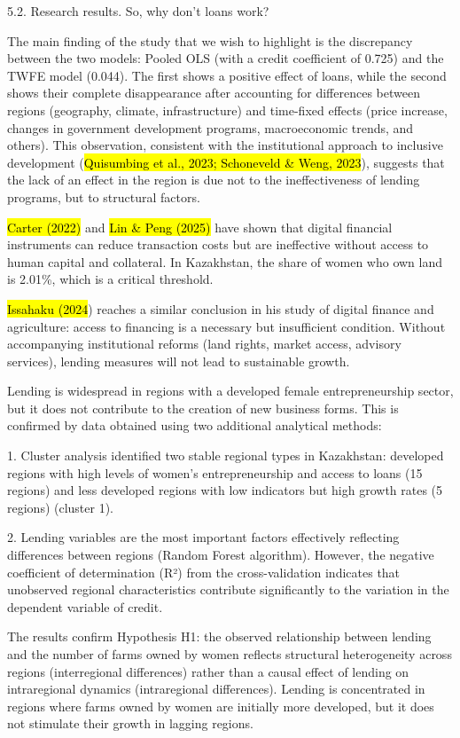 5.2. Research results. So, why don't loans work?

The main finding of the study that we wish to highlight is the
discrepancy between the two models: Pooled OLS (with a credit
coefficient of 0.725) and the TWFE model (0.044). The first shows a
positive effect of loans, while the second shows their complete
disappearance after accounting for differences between regions
(geography, climate, infrastructure) and time-fixed effects (price
increase, changes in government development programs, macroeconomic
trends, and others). This observation, consistent with the institutional
approach to inclusive development (\hl{Quisumbing et al., 2023;
Schoneveld \& Weng, 2023}), suggests that the lack of an effect in the
region is due not to the ineffectiveness of lending programs, but to
structural factors.

\hl{Carter (2022)} and \hl{Lin \& Peng (2025)} have shown that digital
financial instruments can reduce transaction costs but are ineffective
without access to human capital and collateral. In Kazakhstan, the share
of women who own land is 2.01\%, which is a critical threshold.

\hl{Issahaku (2024}) reaches a similar conclusion in his study of
digital finance and agriculture: access to financing is a necessary but
insufficient condition. Without accompanying institutional reforms (land
rights, market access, advisory services), lending measures will not
lead to sustainable growth.

Lending is widespread in regions with a developed female
entrepreneurship sector, but it does not contribute to the creation of
new business forms. This is confirmed by data obtained using two
additional analytical methods:

1. Cluster analysis identified two stable regional types in Kazakhstan:
developed regions with high levels of women's entrepreneurship and
access to loans (15 regions) and less developed regions with low
indicators but high growth rates (5 regions) (cluster 1).

2. Lending variables are the most important factors effectively
reflecting differences between regions (Random Forest algorithm).
However, the negative coefficient of determination (R²) from the
cross-validation indicates that unobserved regional characteristics
contribute significantly to the variation in the dependent variable of
credit.

The results confirm Hypothesis H1: the observed relationship between
lending and the number of farms owned by women reflects structural
heterogeneity across regions (interregional differences) rather than a
causal effect of lending on intraregional dynamics (intraregional
differences). Lending is concentrated in regions where farms owned by
women are initially more developed, but it does not stimulate their
growth in lagging regions.

